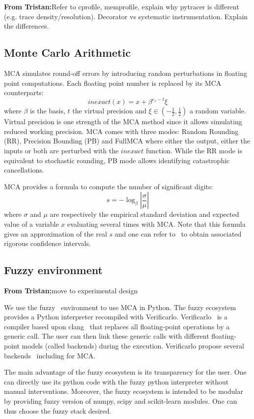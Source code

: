 \documentclass[acmconf,authordraft,anonymous,review]{acmart}
\newcommand{\tristan}[1]{\color{orange}\textbf{From Tristan:}#1\color{black}}
\begin{document}
\tristan{Refer to cprofile, memprofile, explain why pytracer is different (e.g. trace density/resolution). Decorator vs systematic instrumentation. Explain the differences.}

\subsection{Monte Carlo Arithmetic}
MCA simulates round-off errors by introducing random perturbations in floating point computations. Each floating point number is replaced by its MCA counterparts:
\[
inexact(x) =  x + \beta^{e_x - t}\xi
\]
where $\beta$ is the basis, $t$ the virtual precision and $\xi \in (-\frac{1}{2},\frac{1}{2})$ a random variable.
Virtual precision is one strength of the MCA method since it allows simulating 
reduced working precision.
MCA comes with three modes: Random Rounding (RR), Precision Bounding (PB) and FullMCA where either the output, either the inputs or both are perturbed with the $inexact$ function.
While the RR mode is equivalent to stochastic rounding, PB mode allows identifying 
catastrophic cancellations.

MCA provides a formula to compute the number of significant digits:
\[
s = -\log_{\beta}{ \left| \dfrac{\sigma}{\mu} \right|}
\]
where $\sigma$ and $\mu$ are respectively the empirical standard deviation and expected value of a variable $x$ evaluating several times with MCA. 
Note that this formula gives an approximation of the real $s$ and 
one can refer to~\cite{sohier2018confidence} to obtain associated rigorous confidence intervals.

\subsection{Fuzzy environment}

\tristan{move to experimental design}

We use the fuzzy~\cite{kiar2020comparing} environment to use MCA in Python.
The fuzzy ecosystem provides a Python interpreter recompiled with Verificarlo.
Verificarlo~\cite{denis2015verificarlo} is a compiler based upon clang~\cite{lattner2008llvm}
that replaces all floating-point operations by a generic call. 
The user can then link these generic calls with different floating-point models 
(called backends) during the execution. Verificarlo propose several 
backends~\cite{chatelain2019automatic,chatelain2019outils} including for MCA.

The main advantage of the fuzzy ecosystem is its transparency for the user.
One can directly use its python code with the fuzzy python interpreter
without manual interventions. Moreover, the fuzzy ecosystem is intended to be
modular by providing fuzzy version of numpy, scipy and scikit-learn modules.
One can thus choose the fuzzy stack desired.
\end{document}
